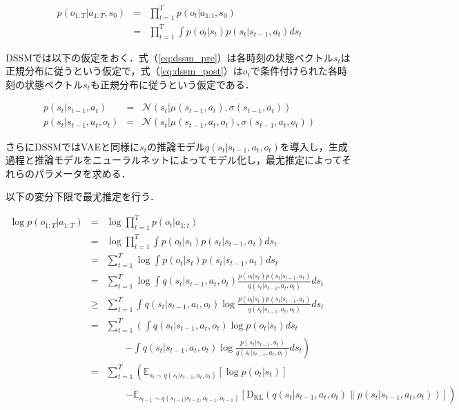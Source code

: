 \begin{eqnarray}
  p(o_{1:T}|a_{1:T}, s_0)
  &=& \prod_{t=1}^T p(o_t|a_{1:t}, s_0) \nonumber \\
  &=& \prod_{t=1}^T \int p(o_t|s_t) p(s_t|s_{t-1}, a_t)ds_t \label{eq:dssm}
\end{eqnarray}

DSSMでは以下の仮定をおく．式（\ref{eq:dssm_pre}）は各時刻の状態ベクトル$s_t$は正規分布に従うという仮定で，式（\ref{eq:dssm_post}）は$o_t$で条件付けられた各時刻の状態ベクトル$s_t$も正規分布に従うという仮定である．

\begin{eqnarray}
  p(s_t|s_{t-1}, a_t) &=& \mathcal{N}(s_t|\mu(s_{t-1}, a_t),\sigma(s_{t-1}, a_t))\label{eq:dssm_pre} \\
  p(s_t|s_{t-1}, a_t, o_t) &=& \mathcal{N}(s_t|\mu(s_{t-1}, a_t, o_t),\sigma(s_{t-1}, a_t, o_t))\label{eq:dssm_post}
\end{eqnarray}

さらにDSSMではVAEと同様に$s_t$の推論モデル$q(s_t|s_{t-1}, a_t, o_t)$を導入し，生成過程と推論モデルをニューラルネットによってモデル化し，最尤推定によってそれらのパラメータを求める．

以下の変分下限で最尤推定を行う．

\begin{eqnarray}
  \log p(o_{1:T}|a_{1:T})
  &=& \log \prod_{t=1}^T p(o_t|a_{1:t}) \nonumber \\
  &=& \log \prod_{t=1}^T \int p(o_t|s_t) p(s_t|s_{t-1}, a_t)ds_t \nonumber \\
  &=& \sum_{t=1}^T \log \int p(o_t|s_t) p(s_t|s_{t-1}, a_t)ds_t \nonumber \\
  &=& \sum_{t=1}^T \log \int q(s_t|s_{t-1}, a_t, o_t) \frac{p(o_t|s_t) p(s_t|s_{t-1}, a_t)}{q(s_t|s_{t-1}, a_t, o_t)}ds_t \label{eq:dssm_replace} \\
  &\geq& \sum_{t=1}^T \int q(s_t|s_{t-1}, a_t, o_t) \log \frac{p(o_t|s_t) p(s_t|s_{t-1}, a_t)}{q(s_t|s_{t-1}, a_t, o_t)}ds_t \label{eq:dssm_jensen} \\
  &=& \sum_{t=1}^T \left( \int q(s_t|s_{t-1}, a_t, o_t) \log p(o_t|s_t)ds_t \right. \nonumber \\
  && \hspace{2em} \left. - \int q(s_t|s_{t-1}, a_t, o_t) \log \frac{p(s_t|s_{t-1}, a_t)}{q(s_t|s_{t-1}, a_t, o_t)}ds_t \right) \nonumber \\
  &=& \sum_{t=1}^T \left( \mathbb{E}_{s_t \sim q(s_t|s_{t-1}, a_t, o_t)} [\log p(o_t|s_t)] \right. \nonumber \\
  && \hspace{2em} \left. - \mathbb{E}_{s_{t-1} \sim q(s_{t-1}|s_{t-2}, a_{t-1}, o_{t-1})} [\mathrm{D_{KL}}(q(s_t|s_{t-1}, a_t, o_t) \| p(s_t|s_{t-1}, a_t, o_t))] \right) \nonumber \\
  \label{eq:dssm_elbo}  
\end{eqnarray}

